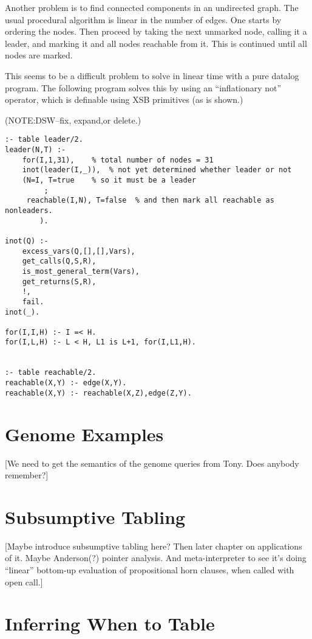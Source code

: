 Another problem is to find connected components in an undirected
graph.  The usual procedural algorithm is linear in the number of
edges.  One starts by ordering the nodes.  Then proceed by taking the
next unmarked node, calling it a leader, and marking it and all nodes
reachable from it.  This is continued until all nodes are marked.

This seems to be a difficult problem to solve in linear time with a pure 
datalog program.  The following program solves this by using an
``inflationary not'' operator, which is definable using XSB primitives 
(as is shown.)  

(NOTE:DSW--fix, expand,or delete.)

\begin{verbatim}
:- table leader/2.
leader(N,T) :-
	for(I,1,31),    % total number of nodes = 31
	inot(leader(I,_)),  % not yet determined whether leader or not
	(N=I, T=true    % so it must be a leader
         ;
	 reachable(I,N), T=false  % and then mark all reachable as nonleaders.
        ).

inot(Q) :-
	excess_vars(Q,[],[],Vars),
	get_calls(Q,S,R),
	is_most_general_term(Vars),
	get_returns(S,R),
	!,
	fail.
inot(_).

for(I,I,H) :- I =< H.
for(I,L,H) :- L < H, L1 is L+1, for(I,L1,H).


:- table reachable/2.
reachable(X,Y) :- edge(X,Y).
reachable(X,Y) :- reachable(X,Z),edge(Z,Y).
\end{verbatim}

\section{Genome Examples}

[We need to get the semantics of the genome queries from Tony.  Does
anybody remember?]

\section{Subsumptive Tabling}

[Maybe introduce subsumptive tabling here?  Then later chapter on
  applications of it.  Maybe Anderson(?) pointer analysis.  And
  meta-interpreter to see it's doing ``linear'' bottom-up evaluation
  of propositional horn clauses, when called with open call.]

\section{Inferring When to Table}

